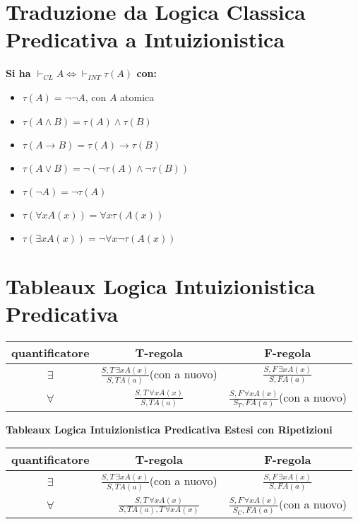 \documentclass[a4paper,12pt, oneside]{book}
\begin{document}
\section*{Traduzione da Logica Classica Predicativa a Intuizionistica}
\begin{center}
  \textbf{Si ha $\vdash_{CL}A\iff \vdash_{INT}\tau(A)$ con:}
\end{center}
\begin{itemize}
  \item $\tau(A)=\neg\neg A$, con $A$ atomica
  \item $\tau(A\land B)=\tau(A)\land \tau (B)$
  \item $\tau(A\to B)=\tau(A)\to \tau (B)$
  \item $\tau(A\lor B)=\neg(\neg \tau(A)\land \neg\tau(B))$
  \item $\tau(\neg A)=\neg\tau(A)$
  \item $\tau(\forall x A(x))=\forall x\tau(A(x))$
  \item $\tau(\exists x A(x))=\neg\forall x\neg\tau(A(x))$
\end{itemize}
\section*{Tableaux Logica Intuizionistica Predicativa}
\begin{table}[H]
  \centering
  \Large
  \begin{tabular}{c||c|c}
    quantificatore & T-regola & F-regola\\
    \hline
    $\exists$ & $\frac{S,T\,\exists x A(x)}{S,TA(a)}${\small{(con a nuovo)}}
                              & $\frac{S,F\,\exists x A(x)}{S,FA(a)}$\\
    \hline
    $\forall$ & $\frac{S,T\,\forall x A(x)}{S,TA(a)}$
                              & $\frac{S,F\,\forall x A(x)}{S_T,
                                FA(a)}${\small{(con a nuovo)}}\\
    \hline
  \end{tabular}
\end{table}
\begin{center}
  \textbf{Tableaux Logica Intuizionistica Predicativa Estesi con Ripetizioni}
\end{center}
\begin{table}[H]
  \centering
  \Large
  \begin{tabular}{c||c|c}
    quantificatore & T-regola & F-regola\\
    \hline
    $\exists$ & $\frac{S,T\,\exists x A(x)}{S,TA(a)}${\small{(con a nuovo)}}
                              & $\frac{S,F\,\exists x A(x)}{S,FA(a)}$\\
    \hline
    $\forall$ & $\frac{S,T\,\forall x A(x)}{S,TA(a),T\,\forall x A(x)}$
                              & $\frac{S,F\,\forall x A(x)}{S_C,
                                FA(a)}${\small{(con a nuovo)}}\\
    \hline
  \end{tabular}
\end{table}
\end{document}
